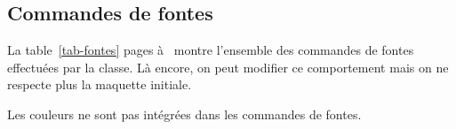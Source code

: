 \documentclass[nocrop]{sesamanuel}
\begin{document}
\subsection{Commandes de fontes}
\label{subsec-commandes-de-fontes}

La table~\ref{tab-fontes} pages \pageref{tab-debut-fontes}
à~\pageref{tab-fontes} montre l'ensemble des commandes de fontes
effectuées par la classe. Là encore, on peut modifier ce comportement
mais on ne respecte plus la maquette initiale.

Les couleurs ne sont pas intégrées dans les commandes de fontes.

\begingroup
\newcommand*\fonte[2]{%
  \cmd{#1} & \texttt{#2}
}%
\newcommand*\taille[2]{%
  \cmd{fontsize\{#1\}\{#2\}}%
}
\newcommand*\titre[1]{\multicolumn{2}{c}{\textbf{#1}}}
\label{tab-debut-fontes}
\centering
\end{document}

